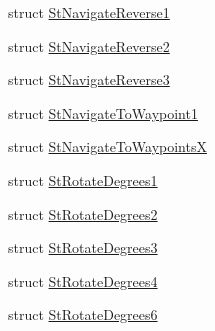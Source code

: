 \begin{DoxyCompactItemize}
\item 
struct \hyperlink{structsm__dance__bot__strikes__back_1_1StNavigateReverse1}{St\+Navigate\+Reverse1}
\item 
struct \hyperlink{structsm__dance__bot__strikes__back_1_1StNavigateReverse2}{St\+Navigate\+Reverse2}
\item 
struct \hyperlink{structsm__dance__bot__strikes__back_1_1StNavigateReverse3}{St\+Navigate\+Reverse3}
\item 
struct \hyperlink{structsm__dance__bot__strikes__back_1_1StNavigateToWaypoint1}{St\+Navigate\+To\+Waypoint1}
\item 
struct \hyperlink{structsm__dance__bot__strikes__back_1_1StNavigateToWaypointsX}{St\+Navigate\+To\+WaypointsX}
\item 
struct \hyperlink{structsm__dance__bot__strikes__back_1_1StRotateDegrees1}{St\+Rotate\+Degrees1}
\item 
struct \hyperlink{structsm__dance__bot__strikes__back_1_1StRotateDegrees2}{St\+Rotate\+Degrees2}
\item 
struct \hyperlink{structsm__dance__bot__strikes__back_1_1StRotateDegrees3}{St\+Rotate\+Degrees3}
\item 
struct \hyperlink{structsm__dance__bot__strikes__back_1_1StRotateDegrees4}{St\+Rotate\+Degrees4}
\item 
struct \hyperlink{structsm__dance__bot__strikes__back_1_1StRotateDegrees6}{St\+Rotate\+Degrees6}
\end{DoxyCompactItemize}
